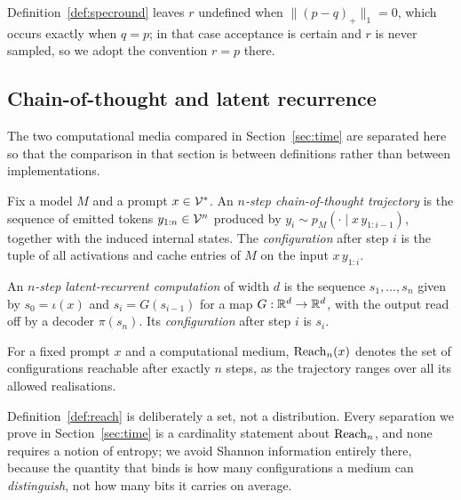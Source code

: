 Definition~\ref{def:specround} leaves $r$ undefined when $\|(p-q)_+\|_1 = 0$,
which occurs exactly when $q = p$; in that case acceptance is certain and $r$ is
never sampled, so we adopt the convention $r = p$ there.

\subsection{Chain-of-thought and latent recurrence}

The two computational media compared in Section~\ref{sec:time} are separated
here so that the comparison in that section is between definitions rather than
between implementations.

\begin{definition}
\label{def:cot}
Fix a model $M$ and a prompt $x \in \mathcal{V}^{*}$. An \emph{$n$-step
chain-of-thought trajectory} is the sequence of emitted tokens
$y_{1:n} \in \mathcal{V}^{n}$ produced by $y_i \sim p_M(\cdot \mid x\, y_{1:i-1})$,
together with the induced internal states. The \emph{configuration} after step
$i$ is the tuple of all activations and cache entries of $M$ on the input
$x\,y_{1:i}$.
\end{definition}

\begin{definition}
\label{def:latent}
An \emph{$n$-step latent-recurrent computation} of width $d$ is the sequence
$s_1,\dots,s_n$ given by $s_0 = \iota(x)$ and $s_{i} = G(s_{i-1})$ for a map
$G : \mathbb{R}^{d} \to \mathbb{R}^{d}$, with the output read off by a decoder $\pi(s_n)$. Its
\emph{configuration} after step $i$ is $s_i$.
\end{definition}

\begin{definition}
\label{def:reach}
For a fixed prompt $x$ and a computational medium, $\mathrm{Reach}_n(x)$ denotes the set
of configurations reachable after exactly $n$ steps, as the trajectory ranges
over all its allowed realisations.
\end{definition}

Definition~\ref{def:reach} is deliberately a set, not a distribution. Every
separation we prove in Section~\ref{sec:time} is a cardinality statement about
$\mathrm{Reach}_n$, and none requires a notion of entropy; we avoid Shannon information
entirely there, because the quantity that binds is how many configurations a
medium can \emph{distinguish}, not how many bits it carries on average.

